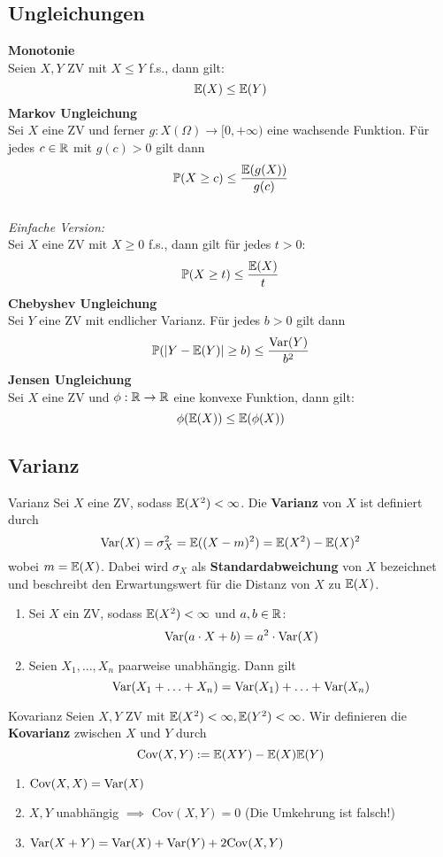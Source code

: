 \subsection{Ungleichungen}
\textbf{Monotonie}
\\Seien $X, Y$ ZV mit $X \leq Y$ f.s., dann gilt:
$$\mathbb{E}(X) \leq \mathbb{E}(Y)$$
\textbf{Markov Ungleichung}
\\Sei $X$ eine ZV und ferner $g: X(\Omega) \to [0, +\infty)$ eine wachsende Funktion. Für jedes $c \in \mathbb{R}$ mit $g(c) > 0$ gilt dann
$$\mathbb{P}(X \geq c) \leq \frac{\mathbb{E}(g(X))}{g(c)}$$
\\\textit{Einfache Version:}
\\Sei $X$ eine ZV mit $X\geq 0$ f.s., dann gilt für jedes $t > 0$:
$$\mathbb{P}(X \geq t) \leq \frac{\mathbb{E}(X)}{t}$$
\textbf{Chebyshev Ungleichung}
\\Sei $Y$ eine ZV mit endlicher Varianz. Für jedes $b > 0$ gilt dann
$$\mathbb{P}(|Y - \mathbb{E}(Y)| \geq b) \leq \frac{\text{Var}(Y)}{b^2}$$
\textbf{Jensen Ungleichung}
\\Sei $X$ eine ZV und $\phi: \mathbb{R} \to \mathbb{R}$ eine konvexe Funktion, dann gilt:
$$\phi(\mathbb{E}(X)) \leq \mathbb{E}(\phi(X))$$

\subsection{Varianz}
\begin{mainbox}{Varianz}
    Sei $X$ eine ZV, sodass $\mathbb{E}(X^2)<\infty$. Die \textbf{Varianz} von $X$ ist definiert durch
    $$\text{Var}(X) = \sigma_X^2 = \mathbb{E}((X - m)^2) = \mathbb{E}(X^2)-\mathbb{E}(X)^2$$
    wobei $m = \mathbb{E}(X)$. Dabei wird $\sigma_X$ als \textbf{Standardabweichung} von $X$ bezeichnet und beschreibt den Erwartungswert für die Distanz von $X$ zu $\mathbb{E}(X)$.
\end{mainbox}

\begin{enumerate}
    \item Sei $X$ ein ZV, sodass $\mathbb{E}(X^2)<\infty$ und $a, b \in \mathbb{R}$:
    $$\text{Var}(a\cdot X + b) = a^2 \cdot \text{Var}(X)$$
    \item Seien $X_1, ..., X_n$ paarweise unabhängig. Dann gilt
    $$\text{Var}(X_1 + \ldots + X_n) = \text{Var}(X_1)+\ldots +\text{Var}(X_n)$$
\end{enumerate}

\begin{mainbox}{Kovarianz}
    Seien $X, Y$ ZV mit $\mathbb{E}(X^2)<\infty, \mathbb{E}(Y^2) < \infty$. Wir definieren die \textbf{Kovarianz} zwischen $X$ und $Y$ durch
    $$\text{Cov}(X,Y) := \mathbb{E}(XY) - \mathbb{E}(X)\mathbb{E}(Y)$$
\end{mainbox}
\begin{enumerate}
    \item $\text{Cov}(X,X) = \text{Var}(X)$
    \item $X, Y$ unabhängig $\implies$ $\text{Cov}(X, Y) = 0$ (Die Umkehrung ist falsch!)
    \item $\text{Var}(X+Y) = \text{Var}(X) + \text{Var}(Y) + 2\text{Cov}(X, Y)$
\end{enumerate}

